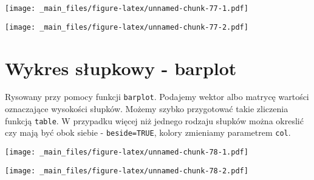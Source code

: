 \documentclass[
]{book}
\newenvironment{Shaded}{\begin{snugshade}}{\end{snugshade}}
\newcommand{\AttributeTok}[1]{\textcolor[rgb]{0.77,0.63,0.00}{#1}}
\newcommand{\ConstantTok}[1]{\textcolor[rgb]{0.00,0.00,0.00}{#1}}
\newcommand{\FunctionTok}[1]{\textcolor[rgb]{0.00,0.00,0.00}{#1}}
\newcommand{\NormalTok}[1]{#1}
\newcommand{\SpecialCharTok}[1]{\textcolor[rgb]{0.00,0.00,0.00}{#1}}
\begin{document}
\texttt{[image: \_main\_files/figure-latex/unnamed-chunk-77-1.pdf]}

\begin{Shaded}
\end{Shaded}

\texttt{[image: \_main\_files/figure-latex/unnamed-chunk-77-2.pdf]}

\hypertarget{wykres-sux142upkowy---barplot}{%
\section{Wykres słupkowy - barplot}\label{wykres-sux142upkowy---barplot}}

Rysowany przy pomocy funkcji \texttt{barplot}. Podajemy wektor albo matrycę wartości oznaczające wysokości słupków. Możemy szybko przygotować takie zliczenia funkcją \texttt{table}. W przypadku więcej niż jednego rodzaju słupków można okreslić czy mają być obok siebie - \texttt{beside=TRUE}, kolory zmieniamy parametrem \texttt{col}.

\begin{Shaded}
\end{Shaded}

\texttt{[image: \_main\_files/figure-latex/unnamed-chunk-78-1.pdf]}

\begin{Shaded}
\end{Shaded}

\texttt{[image: \_main\_files/figure-latex/unnamed-chunk-78-2.pdf]}

\begin{Shaded}
\end{Shaded}
\end{document}
